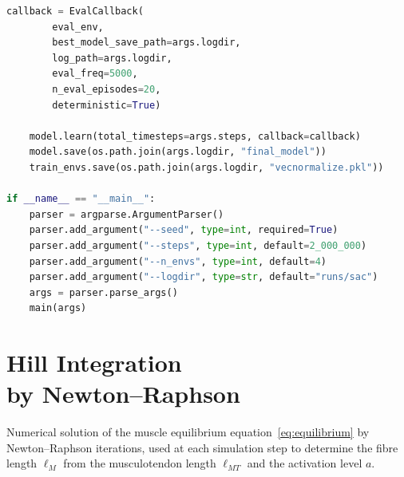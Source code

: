 \begin{lstlisting}[language=Python, caption={Excerpt from \texttt{rl/train.py}.}, label={lst:train}]
    callback = EvalCallback(
        eval_env,
        best_model_save_path=args.logdir,
        log_path=args.logdir,
        eval_freq=5000,
        n_eval_episodes=20,
        deterministic=True)

    model.learn(total_timesteps=args.steps, callback=callback)
    model.save(os.path.join(args.logdir, "final_model"))
    train_envs.save(os.path.join(args.logdir, "vecnormalize.pkl"))

if __name__ == "__main__":
    parser = argparse.ArgumentParser()
    parser.add_argument("--seed", type=int, required=True)
    parser.add_argument("--steps", type=int, default=2_000_000)
    parser.add_argument("--n_envs", type=int, default=4)
    parser.add_argument("--logdir", type=str, default="runs/sac")
    args = parser.parse_args()
    main(args)
\end{lstlisting}

\chapter[Hill Integration by Newton--Raphson]{Hill Integration\\by Newton--Raphson}
\label{app:newton}

Numerical solution of the muscle equilibrium equation~\eqref{eq:equilibrium}
by Newton--Raphson iterations, used at each simulation step to
determine the fibre length $\ell_M$ from the musculotendon length
$\ell_{MT}$ and the activation level $a$.

